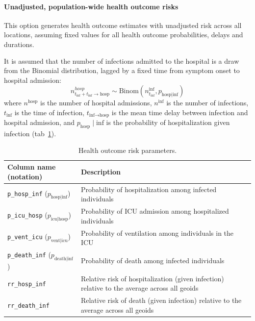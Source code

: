 {\paragraph{Unadjusted, population-wide health outcome risks}
This option generates health outcome estimates with unadjusted risk across all locations, assuming fixed values for all health outcome probabilities, delays and durations.

It is assumed that the number of infections admitted to the hospital is a draw from the Binomial distribution, lagged by a fixed time from symptom onset to hospital admission:
\begin{equation}
n_{t_\text{inf} + t_\text{inf} \to \text{hosp}}^{hosp} \sim \text{Binom}\left(n_{t_\text{inf}}^\text{inf}, p_{\text{hosp}\mid \text{inf}} \right)
\end{equation}
where $n^\text{hosp}$ is the number of hospital admissions, $n^\text{inf}$ is the number of infections, $t_\text{inf}$ is the time of infection, $t_{\text{inf} \to \text{hosp}}$ is the mean time delay between infection and hospital admission, and $p_\text{hosp} \mid \text{inf}$ is the probability of hospitalization given infection (tab~\ref{tab:csp-outcomes}).

\begin{table}[t]
\label{tab:csp-outcomes}
\centering
\begin{tabular}{ll}
\toprule
 Column name (notation) & Description\\
\midrule
\verb|p_hosp_inf| ($p_{\text{hosp} \mid \text{inf}}$)	& Probability of hospitalization among infected individuals\\
\verb|p_icu_hosp| ($p_{\text{icu} \mid \text{hosp}}$)	&Probability of ICU admission among hospitalized individuals\\
\verb|p_vent_icu| ($p_{\text{vent} \mid \text{icu}}$) &	Probability of ventilation among individuals in the ICU\\
\verb|p_death_inf| ($p_{\text{death} \mid \text{inf}}$)&	Probability of death among infected individuals\\
\verb|rr_hosp_inf|	& Relative risk of hospitalization (given infection) relative to the average across all geoids\\
\verb|rr_death_inf| & Relative risk of death (given infection) relative to the average across all geoids\\
\bottomrule
\end{tabular}
\caption[Health outcome risk parameters.]{Health outcome risk parameters.}
\end{table}

}
